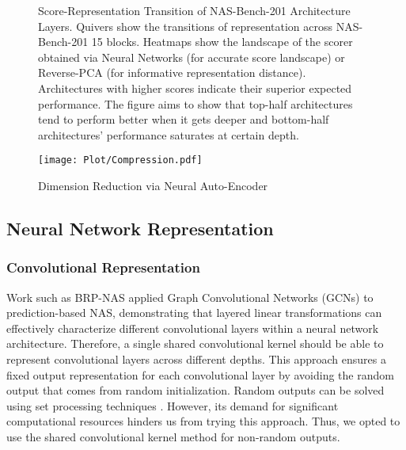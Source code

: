 \documentclass[lettersize,journal]{IEEEtran}
\begin{document}
    \begin{figure*}
        \centering
        
        \hfill

        \caption{Score-Representation Transition of NAS-Bench-201 Architecture Layers. Quivers show the transitions of representation across NAS-Bench-201 15 blocks. Heatmaps show the landscape of the scorer obtained via Neural Networks (for accurate score landscape) or Reverse-PCA (for informative representation distance). Architectures with higher scores indicate their superior expected performance. The figure aims to show that top-half architectures tend to perform better when it gets deeper and bottom-half architectures' performance saturates at certain depth.}
        \label{fig:score_rep_transistion}
    \end{figure*}


    \begin{figure}
        \centering
        
        \texttt{[image: Plot/Compression.pdf]}
        \caption{Dimension Reduction via Neural Auto-Encoder}
        \label{fig:neural_dim_reductor}

    \end{figure}
    
    \subsection{Neural Network Representation} \label{sec:conv}
    
    \subsubsection{Convolutional Representation}
    
    Work such as BRP-NAS \cite{BRP-NAS} applied Graph Convolutional Networks (GCNs) to prediction-based NAS, demonstrating that layered linear transformations can effectively characterize different convolutional layers within a neural network architecture. Therefore, a single shared convolutional kernel should be able to represent convolutional layers across different depths. This approach ensures a fixed output representation for each convolutional layer by avoiding the random output that comes from random initialization. Random outputs can be solved using set processing techniques \cite{Deepsets}. However, its demand for significant computational resources hinders us from trying this approach. Thus, we opted to use the shared convolutional kernel method for non-random outputs.
    
\end{document}
